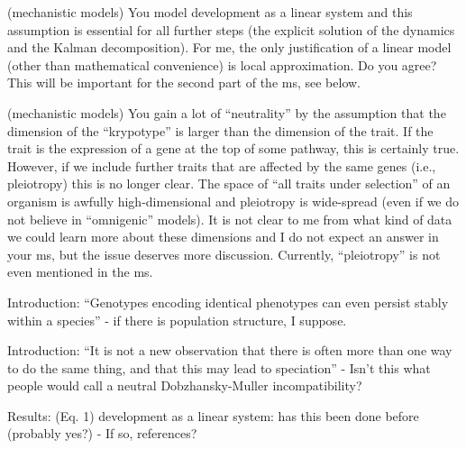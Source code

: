 \begin{point}{(mechanistic models)}
    You model development as a linear system and this assumption is essential
   for all further steps (the explicit solution of the dynamics and the Kalman
decomposition). For me, the only justification of a linear model (other than
mathematical convenience) is local approximation. Do you agree? This will be
important for the second part of the ms, see below.
\end{point}

\reply{
}

\begin{point}{(mechanistic models)}
    You gain a lot of ``neutrality'' by the assumption that the dimension of the
  ``krypotype'' is larger than the dimension of the trait. If the trait is the
expression of a gene at the top of some pathway, this is certainly true.
However, if we include further traits that are affected by the same genes
(i.e., pleiotropy) this is no longer clear. The space of ``all traits under
selection'' of an organism is awfully high-dimensional and pleiotropy is
wide-spread (even if we do not believe in ``omnigenic'' models). It is not clear
to me from what kind of data we could learn more about these dimensions and I
do not expect an answer in your ms, but the issue deserves more discussion.
Currently, ``pleiotropy'' is not even mentioned in the ms.   
\end{point}



\begin{point}{Introduction:}
    ``Genotypes encoding identical phenotypes can even persist stably within a species'' - if there is population structure, I suppose.
\end{point}


\begin{point}{Introduction:}
    ``It is not a new observation that there is often more than one way to do the same thing, and that this may lead to speciation'' - Isn't this what people would call a neutral Dobzhansky-Muller incompatibility?
\end{point}

\reply{
}

\begin{point}{Results:}
    (Eq. 1) development as a linear system: has this been done before (probably yes?) - If so, references?
\end{point}

